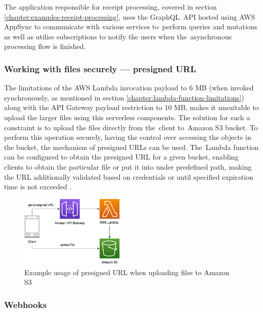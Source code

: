 The application responsible for receipt processing, covered in section \ref{chapter:examples-receipt-processing}, uses the GraphQL~API hosted using AWS AppSync to communicate with various services to~perform queries and mutations as well as utilise subscriptions to notify the users when the~asynchronous processing flow is finished.

\subsubsection{Working with files securely --- presigned URL} \label{chapter:client-presigned-urls}

The limitations of the AWS Lambda invocation payload to 6 MB (when invoked synchronously, as mentioned in section \ref{chapter:lambda-function-limitations}) along with the API Gateway payload restriction to 10 MB, makes it unsuitable to upload the larger files using this serverless components.
The solution for such a constraint is to upload the files directly from the~client to~Amazon S3 bucket.
To perform this operation securely, having the control over accessing the objects in the bucket, the mechanism of presigned URLs can be used.
The~Lambda function can be configured to obtain the presigned URL for a given bucket, enabling clients to obtain the particular file or put it into under predefined path, making the URL additionally validated based on credentials or until specified expiration time is not exceeded \cite{ServerlessAtScaleDesignPatternsAndOptimizations}.

\begin{figure}[H]
   \centering
   \includegraphics[width=0.45\textwidth]{assets/04-serverless-for-web-apps/presignedURL.png}
   \caption{Example usage of presigned URL when uploading files to Amazon S3}
   \label{fig:pattern-presigned-url}
\end{figure}

\subsubsection{Webhooks} \label{chapter:client-webhooks}

